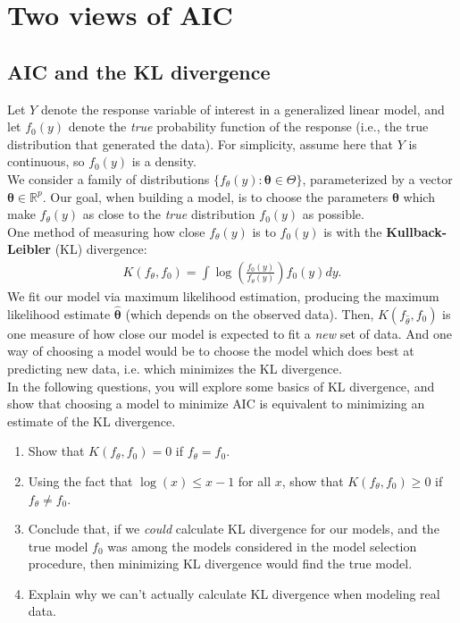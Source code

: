 \documentclass[11pt]{article}
\begin{document}
\section{Two views of AIC}

\subsection*{AIC and the KL divergence}

Let $Y$ denote the response variable of interest in a generalized linear model, and let $f_0(y)$ denote the \textit{true} probability function of the response (i.e., the true distribution that generated the data). For simplicity, assume here that $Y$ is continuous, so $f_0(y)$ is a density.\\

\noindent We consider a family of distributions $\{f_{\theta}(y) : \bm{\theta} \in \Theta \}$, parameterized by a vector $\bm{\theta} \in \mathbb{R}^p$. Our goal, when building a model, is to choose the parameters $\bm{\theta}$ which make $f_\theta(y)$ as close to the \textit{true} distribution $f_0(y)$ as possible.\\

\noindent One method of measuring how close $f_\theta(y)$ is to $f_0(y)$ is with the \textbf{Kullback-Leibler} (KL) divergence:
\begin{align}
K(f_\theta, f_0) = \int \log \left( \frac{f_0(y)}{f_\theta(y)} \right) f_0(y) dy.
\end{align}
We fit our model via maximum likelihood estimation, producing the maximum likelihood estimate $\widehat{\bm{\theta}}$ (which depends on the observed data). Then, $K(f_{\widehat{\theta}}, f_0)$ is one measure of how close our model is expected to fit a \textit{new} set of data. And one way of choosing a model would be to choose the model which does best at predicting new data, i.e. which minimizes the KL divergence.\\

\noindent In the following questions, you will explore some basics of KL divergence, and show that choosing a model to minimize AIC is equivalent to minimizing an estimate of the KL divergence.

\begin{enumerate}
\item Show that $K(f_\theta, f_0) = 0$ if $f_\theta = f_0$.

\item Using the fact that $\log(x) \leq x - 1$ for all $x$, show that $K(f_\theta, f_0) \geq 0$ if $f_\theta \neq f_0$.

\item Conclude that, if we \textit{could} calculate KL divergence for our models, and the true model $f_0$ was among the models considered in the model selection procedure, then minimizing KL divergence would find the true model.

\item Explain why we can't actually calculate KL divergence when modeling real data.
\end{enumerate}
\end{document}
